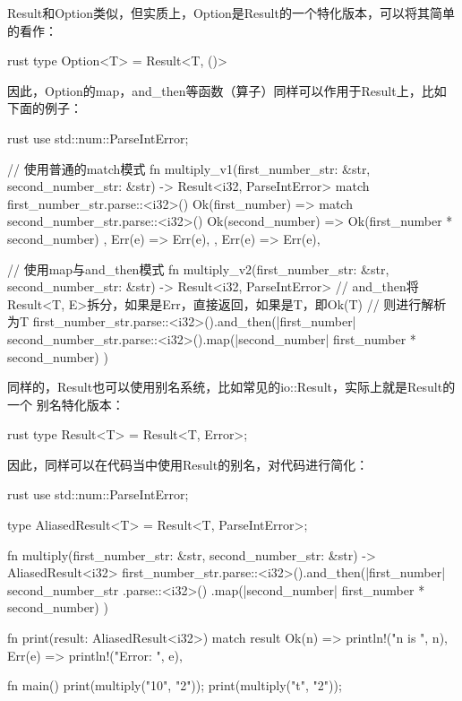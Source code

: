 Result和Option类似，但实质上，Option是Result的一个特化版本，可以将其简单的看作：
\begin{code-block}{rust}
type Option<T> = Result<T, ()>
\end{code-block}

因此，Option的map，and\_then等函数（算子）同样可以作用于Result上，比如下面的例子：
\begin{code-block}{rust}
use std::num::ParseIntError;

// 使用普通的match模式
fn multiply_v1(first_number_str: &str, second_number_str: &str) -> Result<i32, ParseIntError> {
    match first_number_str.parse::<i32>() {
        Ok(first_number)  => {
            match second_number_str.parse::<i32>() {
                Ok(second_number)  => {
                    Ok(first_number * second_number)
                },
                Err(e) => Err(e),
            }
        },
        Err(e) => Err(e),
    }
}

// 使用map与and_then模式
fn multiply_v2(first_number_str: &str, second_number_str: &str) -> Result<i32, ParseIntError> {
    // and_then将Result<T, E>拆分，如果是Err，直接返回，如果是T，即Ok(T)
    // 则进行解析为T
    first_number_str.parse::<i32>().and_then(|first_number| {
        second_number_str.parse::<i32>().map(|second_number| first_number * second_number)
    })
}
\end{code-block}

同样的，Result也可以使用别名系统，比如常见的io::Result，实际上就是Result的一个
别名特化版本：
\begin{code-block}{rust}
type Result<T> = Result<T, Error>;
\end{code-block}
因此，同样可以在代码当中使用Result的别名，对代码进行简化：
\begin{code-block}{rust}
use std::num::ParseIntError;

type AliasedResult<T> = Result<T, ParseIntError>;

fn multiply(first_number_str: &str, second_number_str: &str) -> AliasedResult<i32> {
    first_number_str.parse::<i32>().and_then(|first_number| {
        second_number_str
            .parse::<i32>()
            .map(|second_number| first_number * second_number)
    })
}

fn print(result: AliasedResult<i32>) {
    match result {
        Ok(n) => println!("n is {}", n),
        Err(e) => println!("Error: {}", e),
    }
}

fn main() {
    print(multiply("10", "2"));
    print(multiply("t", "2"));
}
\end{code-block}

